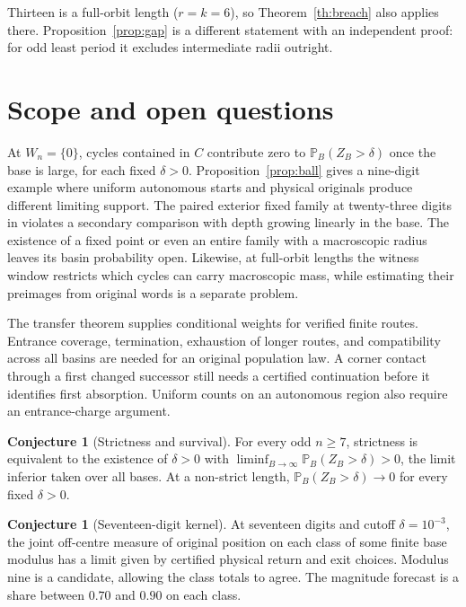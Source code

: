 \documentclass[11pt,reqno]{amsart}
\theoremstyle{definition}
\newtheorem{conjecture}[theorem]{Conjecture}
\newcommand{\PP}{\mathbb P}
\begin{document}
Thirteen is a full-orbit length (\(r=k=6\)), so Theorem~\ref{th:breach} also applies there. Proposition~\ref{prop:gap} is a different statement with an independent proof: for odd least period it excludes intermediate radii outright.

\section{Scope and open questions}\label{sec:scope}
At \(W_n=\{0\}\), cycles contained in \(C\) contribute zero to \(\PP_B(Z_B>\delta)\) once the base is large, for each fixed \(\delta>0\). Proposition~\ref{prop:ball} gives a nine-digit example where uniform autonomous starts and physical originals produce different limiting support. The paired exterior fixed family at twenty-three digits in \cite[Section~7]{G9} violates a secondary comparison with depth growing linearly in the base. The existence of a fixed point or even an entire family with a macroscopic radius leaves its basin probability open. Likewise, at full-orbit lengths the witness window restricts which cycles can carry macroscopic mass, while estimating their preimages from original words is a separate problem.

The transfer theorem supplies conditional weights for verified finite routes. Entrance coverage, termination, exhaustion of longer routes, and compatibility across all basins are needed for an original population law. A corner contact through a first changed successor still needs a certified continuation before it identifies first absorption. Uniform counts on an autonomous region also require an entrance-charge argument.

\begin{conjecture}[Strictness and survival]
For every odd \(n\ge7\), strictness is equivalent to the existence of \(\delta>0\) with \(\liminf_{B\to\infty}\PP_B(Z_B>\delta)>0\), the limit inferior taken over all bases. At a non-strict length, \(\PP_B(Z_B>\delta)\to0\) for every fixed \(\delta>0\).
\end{conjecture}

\begin{conjecture}[Seventeen-digit kernel]
At seventeen digits and cutoff \(\delta=10^{-3}\), the joint off-centre measure of original position on each class of some finite base modulus has a limit given by certified physical return and exit choices. Modulus nine is a candidate, allowing the class totals to agree. The magnitude forecast is a share between \(0.70\) and \(0.90\) on each class.
\end{conjecture}
\end{document}
